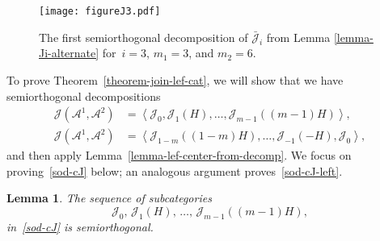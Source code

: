 \documentclass[11pt, reqno]{amsart}
\numberwithin{equation}{section}
\theoremstyle{plain}
\newtheorem{lemma}[theorem]{Lemma}
\theoremstyle{definition}
\newcommand{\barcJ}{\bar{\mathcal{J}}}
\newcommand{\llangle}{\left \langle}
\newcommand{\rrangle}{\right \rangle}
\newcommand{\cA}{\mathcal{A}}
\newcommand{\cJ}{\mathcal{J}}
\begin{document}
\begin{figure}[h]
    \centering
 \texttt{[image: figureJ3.pdf]}
\caption{The first semiorthogonal decomposition of $\barcJ_i$ from Lemma \ref{lemma-Ji-alternate}  for~$i = 3$, $m_1 = 3$, and $m_2 = 6$.}     
\label{figure:J3}
\end{figure}

To prove Theorem~\ref{theorem-join-lef-cat}, we will show that we have semiorthogonal decompositions 
\begin{align}
\label{sod-cJ}
\cJ(\cA^1, \cA^2) & = \llangle \cJ_0 , \cJ_1(H), \dots, \cJ_{m-1}((m-1)H) \rrangle, \\ 
\label{sod-cJ-left}
\cJ(\cA^1, \cA^2) & = \llangle \cJ_{1-m}((1-m)H), \dots, \cJ_{-1}(-H), \cJ_0 \rrangle, 
\end{align} 
and then apply Lemma~\ref{lemma-lef-center-from-decomp}.
We focus on proving~\eqref{sod-cJ} below; an analogous argument proves~\eqref{sod-cJ-left}. 

\begin{lemma}
\label{lemma-fji}
The sequence of subcategories 
\begin{equation}
\label{A-sequence} 
\cJ_0 , \, \cJ_1(H), \, \dots, \, \cJ_{m-1}((m-1)H) , 
\end{equation}
in~\eqref{sod-cJ} is semiorthogonal.
\end{lemma}
\end{document}
